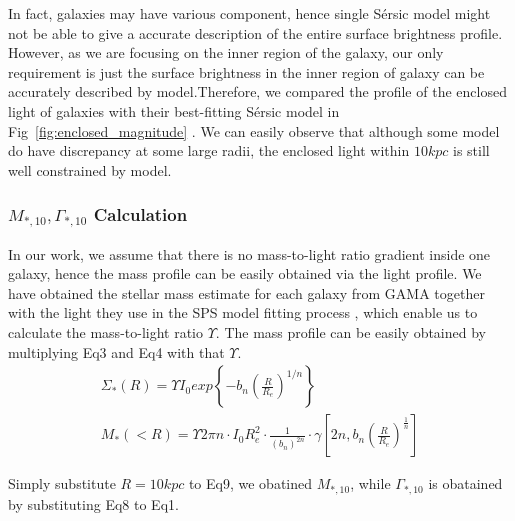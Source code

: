 \documentclass[fleqn,usenatbib]{mnras}
\begin{document}
\par In fact, galaxies may have various component, hence single S\'{e}rsic model might not be able to give a accurate description of the entire surface brightness profile. However, as we are focusing on the inner region of the galaxy, our only requirement is just the surface brightness in the inner region of galaxy can be accurately described by model.Therefore, we compared the profile of the enclosed light of galaxies with their best-fitting S\'{e}rsic model in Fig~\ref{fig:enclosed_magnitude} . We can easily observe that although some model do have discrepancy at some large radii, the enclosed light within $10kpc$ is still well constrained by model. 
\subsubsection{$M_{*,10}, \Gamma_{*,10}$ Calculation}
\label{sec:cal}
In our work, we assume that there is no mass-to-light ratio gradient inside one galaxy, hence the mass profile can be easily obtained via the light profile. We have obtained the stellar mass estimate for each galaxy from GAMA together with the light they use in the SPS model fitting process \citep{GAMAmain}, which enable us to calculate the mass-to-light ratio $\Upsilon$. The mass profile can be easily obtained by multiplying Eq3 and Eq4 with that $\Upsilon$.
\begin{gather}
    \Sigma_*(R) = \Upsilon I_0 exp\left\{-b_n\left(\frac{R}{R_e}\right)^{1/n}\right\} \\
    M_*(<R) = \Upsilon 2\pi n\cdot I_0R_e^2 \cdot \frac{1}{\left(b_n\right)^{2n}}\cdot \gamma\left[2n,b_n \left(\frac{R}{R_e}\right)^{\frac{1}{n}}\right]
\end{gather}
\par Simply substitute $R = 10kpc$ to Eq9, we obatined $M_{*,10}$, while $\Gamma_{*,10}$ is obatained by substituting Eq8 to Eq1. 
\end{document}
